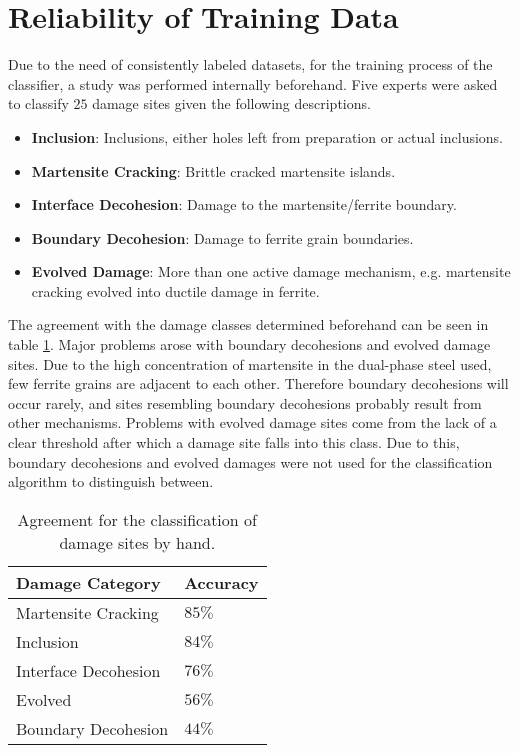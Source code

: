 \section{Reliability of Training Data}

Due to the need of consistently labeled datasets, for the training process of the classifier, a study was performed internally beforehand. Five experts were asked to classify $25$ damage sites given the following descriptions. 
\begin{itemize}[label={}]
\item \textbf{Inclusion}: Inclusions, either holes left from preparation or actual inclusions.
\item \textbf{Martensite Cracking}: Brittle cracked martensite islands.
\item \textbf{Interface Decohesion}: Damage to the martensite/ferrite boundary.
\item \textbf{Boundary Decohesion}: Damage to ferrite grain boundaries.
\item \textbf{Evolved Damage}: More than one active damage mechanism, e.g. martensite cracking evolved into ductile damage in ferrite.
\end{itemize}
The agreement with the damage classes determined beforehand can be seen in table \ref{tab:Reliability}. Major problems arose with boundary decohesions and evolved damage sites. Due to the high concentration of martensite in the dual-phase steel used, few ferrite grains are adjacent to each other. Therefore boundary decohesions will occur rarely, and sites resembling boundary decohesions probably result from other mechanisms. Problems with evolved damage sites come from the lack of a clear threshold after which a damage site falls into this class. Due to this, boundary decohesions and evolved damages were not used for the classification algorithm to distinguish between.\\

\begin{table}[H]
 \begin{center}
  \begin{tabular}{@{} *2l @{}} \toprule[2pt]
   Damage Category & Accuracy \\\midrule
   Martensite Cracking & $85 \%$   \\ 
   Inclusion  & $84 \%$ \\ 
   Interface Decohesion  & $76 \% $ \\
   Evolved & $56\%$ \\
   Boundary Decohesion & $44 \%$ \\ \bottomrule[2pt]

  \end{tabular}
 \end{center}
 \caption{Agreement for the classification of damage sites by hand. }
 \label{tab:Reliability}
\end{table}

